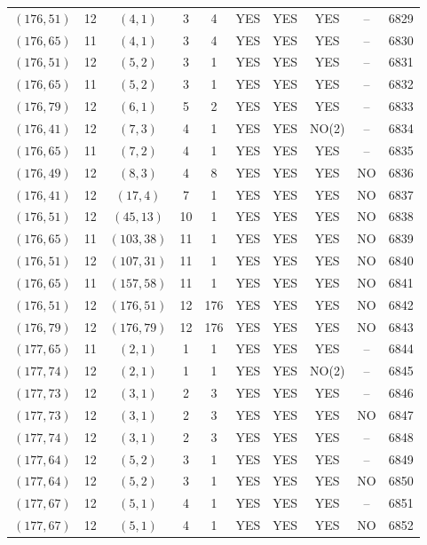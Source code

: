 \begin{longtable}{|c|c|c|c|c|c|c|c|c|c|}
$(176, 51)$ & 12 & $(4, 1)$ & 3 & 4 & YES & YES & YES & -- & 6829\\
$(176, 65)$ & 11 & $(4, 1)$ & 3 & 4 & YES & YES & YES & -- & 6830\\
$(176, 51)$ & 12 & $(5, 2)$ & 3 & 1 & YES & YES & YES & -- & 6831\\
$(176, 65)$ & 11 & $(5, 2)$ & 3 & 1 & YES & YES & YES & -- & 6832\\
$(176, 79)$ & 12 & $(6, 1)$ & 5 & 2 & YES & YES & YES & -- & 6833\\
$(176, 41)$ & 12 & $(7, 3)$ & 4 & 1 & YES & YES & NO(2) & -- & 6834\\
$(176, 65)$ & 11 & $(7, 2)$ & 4 & 1 & YES & YES & YES & -- & 6835\\
$(176, 49)$ & 12 & $(8, 3)$ & 4 & 8 & YES & YES & YES & NO & 6836\\
$(176, 41)$ & 12 & $(17, 4)$ & 7 & 1 & YES & YES & YES & NO & 6837\\
$(176, 51)$ & 12 & $(45, 13)$ & 10 & 1 & YES & YES & YES & NO & 6838\\
$(176, 65)$ & 11 & $(103, 38)$ & 11 & 1 & YES & YES & YES & NO & 6839\\
$(176, 51)$ & 12 & $(107, 31)$ & 11 & 1 & YES & YES & YES & NO & 6840\\
$(176, 65)$ & 11 & $(157, 58)$ & 11 & 1 & YES & YES & YES & NO & 6841\\
$(176, 51)$ & 12 & $(176, 51)$ & 12 & 176 & YES & YES & YES & NO & 6842\\
$(176, 79)$ & 12 & $(176, 79)$ & 12 & 176 & YES & YES & YES & NO & 6843\\
$(177, 65)$ & 11 & $(2, 1)$ & 1 & 1 & YES & YES & YES & -- & 6844\\
$(177, 74)$ & 12 & $(2, 1)$ & 1 & 1 & YES & YES & NO(2) & -- & 6845\\
$(177, 73)$ & 12 & $(3, 1)$ & 2 & 3 & YES & YES & YES & -- & 6846\\
$(177, 73)$ & 12 & $(3, 1)$ & 2 & 3 & YES & YES & YES & NO & 6847\\
$(177, 74)$ & 12 & $(3, 1)$ & 2 & 3 & YES & YES & YES & -- & 6848\\
$(177, 64)$ & 12 & $(5, 2)$ & 3 & 1 & YES & YES & YES & -- & 6849\\
$(177, 64)$ & 12 & $(5, 2)$ & 3 & 1 & YES & YES & YES & NO & 6850\\
$(177, 67)$ & 12 & $(5, 1)$ & 4 & 1 & YES & YES & YES & -- & 6851\\
$(177, 67)$ & 12 & $(5, 1)$ & 4 & 1 & YES & YES & YES & NO & 6852\\

\end{longtable}
